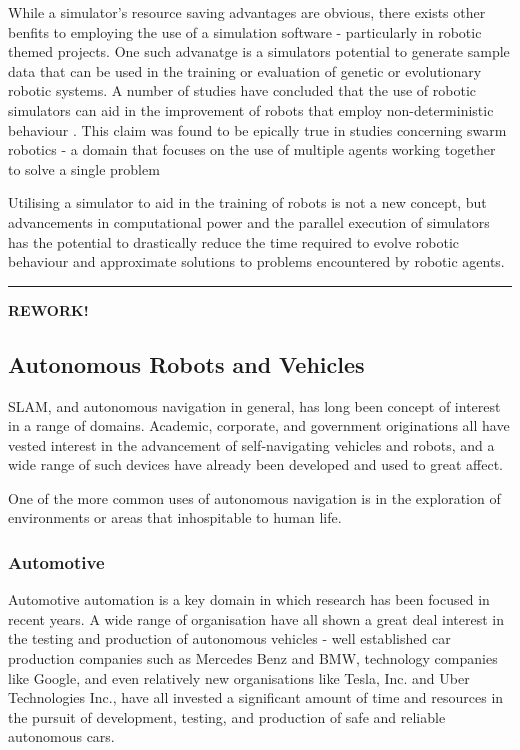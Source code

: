 While a simulator's resource saving advantages are obvious, there exists other
benfits to employing the use of a simulation software - particularly in
robotic themed projects.
One such advanatge is a simulators potential to generate sample data that can
be used in the training or evaluation of genetic or evolutionary robotic
systems.
A number of studies have concluded that the use of robotic simulators can
aid in the improvement of robots that employ non-deterministic behaviour
\cite{7139550,7139557}.
This claim was found to be epically true in studies concerning swarm robotics
- a domain that focuses on the use of multiple agents working together to solve
a single problem \cite{Wischmann864,R2016,Yao2014}

Utilising a simulator to aid in the training of robots is not a new concept,
but advancements in computational power and the parallel execution of
simulators has the potential to drastically reduce the time required to evolve
robotic behaviour and approximate solutions to problems encountered by robotic
agents.

\pagebreak

\noindent\rule{\textwidth}{1pt}
{\bf REWORK!}
\subsection{Autonomous Robots and Vehicles}
SLAM, and autonomous navigation in general, has long been concept of interest
in a range of domains.
Academic, corporate, and government originations all have vested interest in
the advancement of self-navigating vehicles and robots, and a wide range of
such devices have already been developed and used to great affect.

One of the more common uses of autonomous navigation is in the exploration of
environments or areas that inhospitable to human life.

\subsubsection{Automotive}
Automotive automation is a key domain in which research has been focused in
recent years.
A wide range of organisation have all shown a great deal interest in the testing
and production of autonomous vehicles - well established car production companies
such as Mercedes Benz and BMW, technology companies like Google, and even
relatively new organisations like Tesla, Inc. and Uber Technologies Inc., have
all invested a significant amount of time and resources in the pursuit of
development, testing, and production of safe and reliable autonomous cars.

